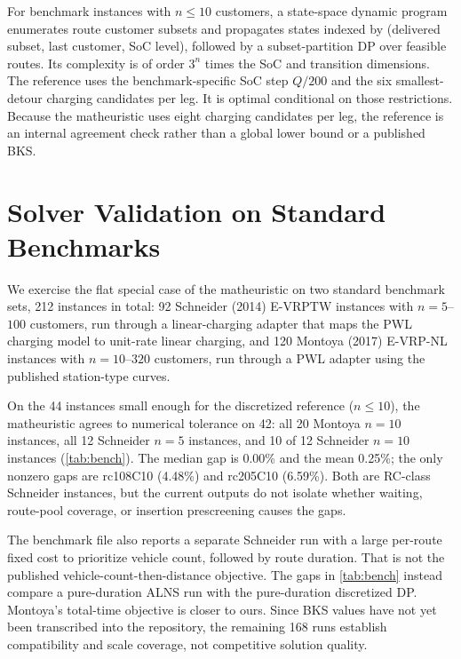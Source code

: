 \documentclass[review,3p,authoryear]{elsarticle}
\begin{document}
For benchmark instances with $n \le 10$ customers, a state-space dynamic
program enumerates route customer subsets and propagates states indexed by
(delivered subset, last customer, SoC level), followed by a subset-partition
DP over feasible routes.  Its complexity is of order $3^n$ times the SoC
and transition dimensions.  The reference uses the benchmark-specific
SoC step $Q/200$ and the six smallest-detour charging candidates per leg.
It is optimal conditional on those restrictions.  Because the matheuristic
uses eight charging candidates per leg, the reference is an internal
agreement check rather than a global lower bound or a published BKS.

\section{Solver Validation on Standard Benchmarks}
\label{sec:validation}

We exercise the flat special case of the matheuristic on two standard
benchmark sets, 212 instances in total: 92 Schneider (2014) E-VRPTW
instances with $n = 5$--$100$ customers, run through a linear-charging
adapter that maps the PWL charging model to unit-rate linear charging,
and 120 Montoya (2017) E-VRP-NL instances with $n = 10$--$320$
customers, run through a PWL adapter using the published station-type
curves.

On the 44 instances small enough for the discretized reference
($n \le 10$), the matheuristic agrees to numerical tolerance on 42: all
20 Montoya $n = 10$ instances, all 12 Schneider $n = 5$ instances, and
10 of 12 Schneider $n = 10$ instances (\cref{tab:bench}).  The median
gap is 0.00\% and the mean 0.25\%; the only nonzero gaps are rc108C10
(4.48\%) and rc205C10 (6.59\%).  Both are RC-class Schneider instances,
but the current outputs do not isolate whether waiting, route-pool coverage,
or insertion prescreening causes the gaps.

The benchmark file also reports a separate Schneider run with a large
per-route fixed cost to prioritize vehicle count, followed by route duration.
That is not the published vehicle-count-then-distance objective.  The gaps in
\cref{tab:bench} instead compare a pure-duration ALNS run with the
pure-duration discretized DP.  Montoya's total-time objective is closer to
ours.  Since BKS values have not yet been transcribed into the repository,
the remaining 168 runs establish compatibility and scale coverage, not
competitive solution quality.
\end{document}
